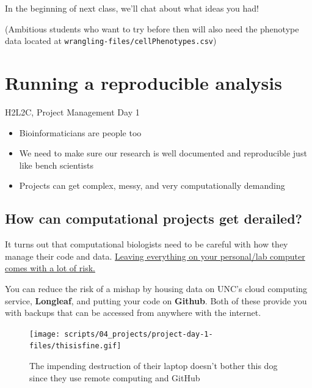 \documentclass[
  letterpaper,
  DIV=11,
  numbers=noendperiod]{scrreprt}
\providecommand{\tightlist}{%
  \setlength{\itemsep}{0pt}\setlength{\parskip}{0pt}}\usepackage{longtable,booktabs,array}
\begin{document}
In the beginning of next class, we'll chat about what ideas you had!

(Ambitious students who want to try before then will also need the
phenotype data located at \texttt{wrangling-files/cellPhenotypes.csv})


\hypertarget{running-a-reproducible-analysis}{%
\chapter{Running a reproducible
analysis}\label{running-a-reproducible-analysis}}

H2L2C, Project Management Day 1

\hfill\break

\begin{itemize}
\tightlist
\item
  Bioinformaticians are people too
\item
  We need to make sure our research is well documented and reproducible
  just like bench scientists
\item
  Projects can get complex, messy, and very computationally demanding
\end{itemize}

\hypertarget{how-can-computational-projects-get-derailed}{%
\section{How can computational projects get
derailed?}\label{how-can-computational-projects-get-derailed}}

It turns out that computational biologists need to be careful with how
they manage their code and data. \uline{Leaving everything on your
personal/lab computer comes with a lot of risk.}

You can reduce the risk of a mishap by housing data on UNC's cloud
computing service, \textbf{Longleaf}, and putting your code on
\textbf{Github}. Both of these provide you with backups that can be
accessed from anywhere with the internet.

\begin{figure}

{\centering \texttt{[image: scripts/04\_projects/project-day-1-files/thisisfine.gif]}

}

\caption{The impending destruction of their laptop doesn't bother this
dog since they use remote computing and GitHub}

\end{figure}
\end{document}
